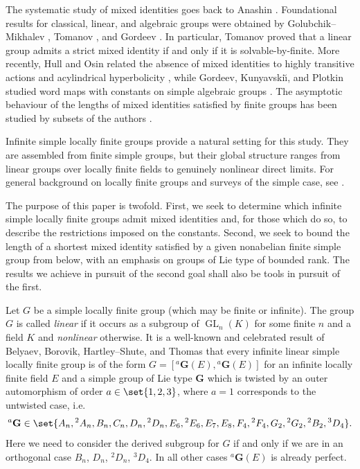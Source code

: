 \documentclass[a4paper,12pt]{amsproc}
\DeclareMathOperator{\GL}{GL}%
\theoremstyle{plain}
\theoremstyle{definition}
\begin{document}
The systematic study of mixed identities goes back to Anashin
\cites{anashin1978mixed,anashin1987mixed}. Foundational results for
classical, linear, and algebraic groups were obtained by
Golubchik--Mikhalev \cite{golubchikmikhalev1982generalized}, Tomanov \cite{tomanov1985generalized}, and Gordeev \cite{gordeev1997freedom}. In particular, Tomanov proved that a linear group
admits a strict mixed identity if and only if it is solvable-by-finite. More recently, Hull and Osin related the
absence of mixed identities to highly transitive actions and
acylindrical hyperbolicity \cite{hullosin2016transitivity}, while
Gordeev, Kunyavski\u{\i}, and Plotkin studied word maps with constants on
simple algebraic groups \cite{gordeevkunyavskiiplotkin2018word}. The asymptotic behaviour of the lengths of mixed identities satisfied by 
finite groups has been studied by subsets of the authors 
\cites{bradfordschneiderthom2023length,bradfordschneiderthom2023non,schneiderthom2022word}.

Infinite simple locally finite groups provide a natural setting for this
study. They are assembled from finite simple groups, but their global
structure ranges from linear groups over locally finite fields to genuinely
nonlinear direct limits. 
For general background on locally finite groups and surveys of the
simple case, see
\cites{kegelwehrfritz1973locally,hartley1995simple,meierfrankenfeld2011locally}.

The purpose of this paper is twofold. First, we seek to determine which
infinite simple locally finite groups admit mixed identities and, for those which do so, to describe the restrictions imposed on the constants. 
Second, we seek to bound the length of a shortest mixed identity 
satisfied by a given nonabelian finite simple group from below, 
with an emphasis on groups of Lie type of bounded rank. 
The results we achieve in pursuit of the second goal shall also be 
tools in pursuit of the first.

Let $G$ be a simple locally finite group (which may be finite or infinite). The group $G$ is called \emph{linear} if it occurs as a subgroup of $\GL_n(K)$ for some finite $n$ and a field $K$ and \emph{nonlinear} otherwise. It is a well-known and celebrated result of Belyaev, Borovik, Hartley--Shute, and Thomas \cites{belyaev1984locally, borovik1983embeddings, hartleyshute1984monomorphisms, thomas1983classification} that every infinite linear simple locally finite group is of the form $G=[{}^a\mathbf{G}(E),{}^a\mathbf{G}(E)]$ for an infinite locally finite field $E$ and a simple group of Lie type $\mathbf{G}$ which is twisted by an outer automorphism of order $a\in\set{1,2,3}$, where $a=1$ corresponds to the untwisted case, i.e.
$$
{}^a\mathbf{G}\in\set{A_n,{}^2A_n,B_n,C_n,D_n,{}^2D_n, E_6,{}^2E_6, E_7,E_8, F_4, {}^2F_4,G_2, {}^2G_2, {}^2B_2,  {}^3D_4}. 
$$
Here we need to consider the derived subgroup for $G$ if and only if we are in an orthogonal case $B_n$, $D_n$, ${}^2D_n$, ${}^3D_4$. In all other cases ${}^a\mathbf{G}(E)$ is already perfect.
\end{document}
